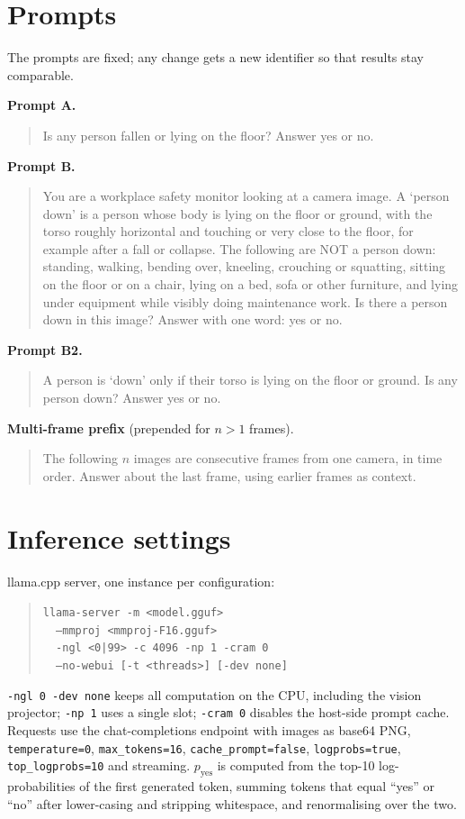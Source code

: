 \section{Prompts}
\label{app:prompts}
The prompts are fixed; any change gets a new identifier so that results stay comparable.

\noindent\textbf{Prompt A.}
\begin{quote}\small
Is any person fallen or lying on the floor? Answer yes or no.
\end{quote}

\noindent\textbf{Prompt B.}
\begin{quote}\small
You are a workplace safety monitor looking at a camera image. A `person down' is a person whose body is lying on the floor or ground, with the torso roughly horizontal and touching or very close to the floor, for example after a fall or collapse. The following are NOT a person down: standing, walking, bending over, kneeling, crouching or squatting, sitting on the floor or on a chair, lying on a bed, sofa or other furniture, and lying under equipment while visibly doing maintenance work. Is there a person down in this image? Answer with one word: yes or no.
\end{quote}

\noindent\textbf{Prompt B2.}
\begin{quote}\small
A person is `down' only if their torso is lying on the floor or ground. Is any person down? Answer yes or no.
\end{quote}

\noindent\textbf{Multi-frame prefix} (prepended for $n>1$ frames).
\begin{quote}\small
The following $n$ images are consecutive frames from one camera, in time order. Answer about the last frame, using earlier frames as context.
\end{quote}

\section{Inference settings}
\label{app:settings}
llama.cpp server, one instance per configuration:
\begin{quote}\small\raggedright
\texttt{llama-server -m <model.gguf>}\\
\texttt{~~--mmproj <mmproj-F16.gguf>}\\
\texttt{~~-ngl <0|99> -c 4096 -np 1 -cram 0}\\
\texttt{~~--no-webui [-t <threads>] [-dev none]}
\end{quote}
\texttt{-ngl 0 -dev none} keeps all computation on the CPU, including the vision projector; \texttt{-np 1} uses a single slot; \texttt{-cram 0} disables the host-side prompt cache. Requests use the chat-completions endpoint with images as base64 PNG, \texttt{temperature=0}, \texttt{max\_tokens=16}, \texttt{cache\_prompt=false}, \texttt{logprobs=true}, \texttt{top\_logprobs=10} and streaming. $p_\text{yes}$ is computed from the top-10 log-probabilities of the first generated token, summing tokens that equal ``yes'' or ``no'' after lower-casing and stripping whitespace, and renormalising over the two.


